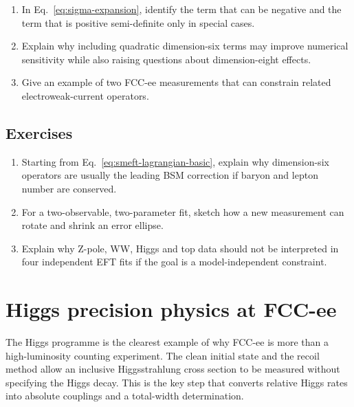 \documentclass[11pt,a4paper]{article}
\numberwithin{equation}{section}
\begin{document}
\begin{guidedchecksbox}
\begin{enumerate}[leftmargin=1.6em]
\item In Eq.~\eqref{eq:sigma-expansion}, identify the term that can be negative and the term that is positive semi-definite only in special cases.
\item Explain why including quadratic dimension-six terms may improve numerical sensitivity while also raising questions about dimension-eight effects.
\item Give an example of two FCC-ee measurements that can constrain related electroweak-current operators.
\end{enumerate}
\end{guidedchecksbox}

\subsection{Exercises}
\begin{enumerate}[leftmargin=1.6em]
\item Starting from Eq.~\eqref{eq:smeft-lagrangian-basic}, explain why dimension-six operators are usually the leading BSM correction if baryon and lepton number are conserved.
\item For a two-observable, two-parameter fit, sketch how a new measurement can rotate and shrink an error ellipse.
\item Explain why Z-pole, WW, Higgs and top data should not be interpreted in four independent EFT fits if the goal is a model-independent constraint.
\end{enumerate}


\newpage
\section{Higgs precision physics at FCC-ee}
\begin{guidelinebox}
The Higgs programme is the clearest example of why FCC-ee is more than a high-luminosity counting experiment. The clean initial state and the recoil method allow an inclusive Higgsstrahlung cross section to be measured without specifying the Higgs decay. This is the key step that converts relative Higgs rates into absolute couplings and a total-width determination.
\end{guidelinebox}
\end{document}
